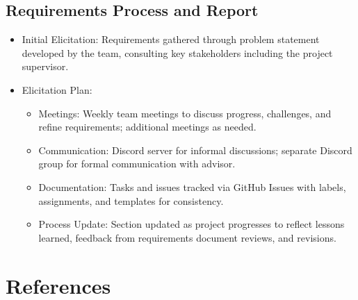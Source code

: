 \documentclass{article}
\begin{document}
\subsection{Requirements Process and Report}\label{subsec:reqprocess}
\begin{itemize}
    \item {Initial Elicitation}: Requirements gathered through problem statement developed by the team, consulting key stakeholders including the project supervisor.
    \item {Elicitation Plan}:
    \begin{itemize}
        \item Meetings: Weekly team meetings to discuss progress, challenges, and refine requirements; additional meetings as needed.
        \item Communication: Discord server for informal discussions; separate Discord group for formal communication with advisor.
        \item Documentation: Tasks and issues tracked via GitHub Issues with labels, assignments, and templates for consistency.
        \item Process Update: Section updated as project progresses to reflect lessons learned, feedback from requirements document reviews, and revisions.
    \end{itemize}
\end{itemize}

\section*{References}
\end{document}
